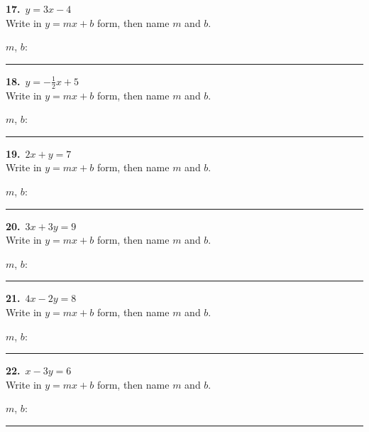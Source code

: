 \documentclass[11pt,letterpaper]{article}
\begin{document}
\needspace{3.5cm}\par\vspace{3mm}\noindent \begin{minipage}[t][3.0cm]{0.48\linewidth}\raggedright{\color{fmturn}\bfseries 17.}\ $y = 3x - 4$ \\ Write in $y = mx + b$ form, then name $m$ and $b$.\par\vfill\hfill $m$, $b$:\ \rule{3.2cm}{0.4pt}\end{minipage}\hfill \begin{minipage}[t][3.0cm]{0.48\linewidth}\raggedright{\color{fmturn}\bfseries 18.}\ $y = -\tfrac12 x + 5$ \\ Write in $y = mx + b$ form, then name $m$ and $b$.\par\vfill\hfill $m$, $b$:\ \rule{3.2cm}{0.4pt}\end{minipage}\par
\needspace{3.5cm}\par\vspace{3mm}\noindent \begin{minipage}[t][3.0cm]{0.48\linewidth}\raggedright{\color{fmturn}\bfseries 19.}\ $2x + y = 7$ \\ Write in $y = mx + b$ form, then name $m$ and $b$.\par\vfill\hfill $m$, $b$:\ \rule{3.2cm}{0.4pt}\end{minipage}\hfill \begin{minipage}[t][3.0cm]{0.48\linewidth}\raggedright{\color{fmturn}\bfseries 20.}\ $3x + 3y = 9$ \\ Write in $y = mx + b$ form, then name $m$ and $b$.\par\vfill\hfill $m$, $b$:\ \rule{3.2cm}{0.4pt}\end{minipage}\par
\needspace{3.5cm}\par\vspace{3mm}\noindent \begin{minipage}[t][3.0cm]{0.48\linewidth}\raggedright{\color{fmturn}\bfseries 21.}\ $4x - 2y = 8$ \\ Write in $y = mx + b$ form, then name $m$ and $b$.\par\vfill\hfill $m$, $b$:\ \rule{3.2cm}{0.4pt}\end{minipage}\hfill \begin{minipage}[t][3.0cm]{0.48\linewidth}\raggedright{\color{fmturn}\bfseries 22.}\ $x - 3y = 6$ \\ Write in $y = mx + b$ form, then name $m$ and $b$.\par\vfill\hfill $m$, $b$:\ \rule{3.2cm}{0.4pt}\end{minipage}\par
\end{document}
